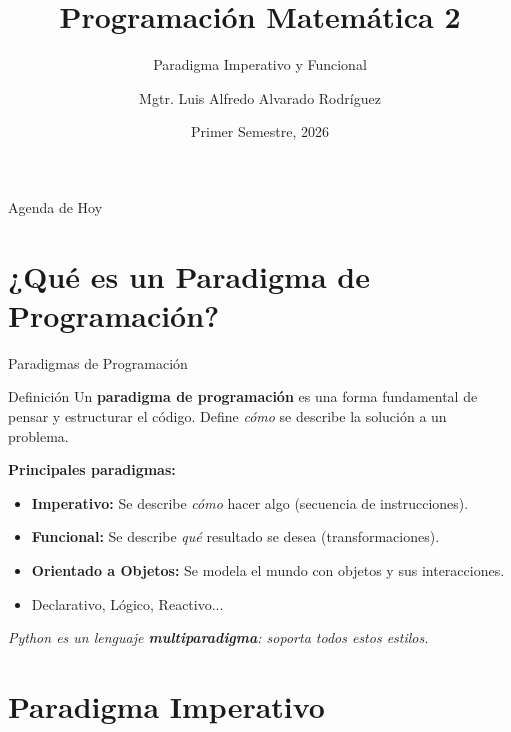 \documentclass[aspectratio=169]{beamer}
\title[M503]{Programación Matemática 2}
\subtitle{Paradigma Imperativo y Funcional}
\author[Luis Alfredo Alvarado]{Mgtr. Luis Alfredo Alvarado Rodríguez}
\institute[ECFM - USAC]{
    Escuela de Ciencias Físicas y Matemáticas \\
    Universidad de San Carlos de Guatemala
}
\date{Primer Semestre, 2026}
\begin{document}
\begin{frame}
    \titlepage
\end{frame}

\begin{frame}{Agenda de Hoy}
    \tableofcontents
\end{frame}

\section{¿Qué es un Paradigma de Programación?}

\begin{frame}{Paradigmas de Programación}
    \begin{block}{Definición}
        Un \textbf{paradigma de programación} es una forma fundamental de pensar y estructurar el código. Define \textit{cómo} se describe la solución a un problema.
    \end{block}
    \vspace{0.5cm}
    
    \textbf{Principales paradigmas:}
    \begin{itemize}
        \item \textbf{Imperativo:} Se describe \textit{cómo} hacer algo (secuencia de instrucciones).
        \item \textbf{Funcional:} Se describe \textit{qué} resultado se desea (transformaciones).
        \item \textbf{Orientado a Objetos:} Se modela el mundo con objetos y sus interacciones.
        \item Declarativo, Lógico, Reactivo...
    \end{itemize}
    \vspace{0.3cm}
    \centering
    \textit{Python es un lenguaje \textbf{multiparadigma}: soporta todos estos estilos.}
\end{frame}

\section{Paradigma Imperativo}
\end{document}
